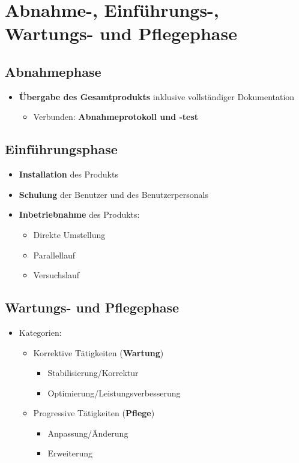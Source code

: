 \section{Abnahme-, Einführungs-, Wartungs- und Pflegephase}
	
\subsection{Abnahmephase}
\begin{itemize}
\item \textbf{Übergabe des Gesamtprodukts} inklusive vollständiger Dokumentation
\begin{itemize}
\item Verbunden: \textbf{Abnahmeprotokoll und -test}
\end{itemize}
\end{itemize}
	
\subsection{Einführungsphase}

\begin{itemize}
\item \textbf{Installation} des Produkts
\item \textbf{Schulung} der Benutzer und des Benutzerpersonals
\item \textbf{Inbetriebnahme} des Produkts:
\begin{itemize}
\item Direkte Umstellung
\item Parallellauf
\item Versuchslauf
\end{itemize}
\end{itemize}
		
\subsection{Wartungs- und Pflegephase}

\begin{itemize}
\item Kategorien:
\begin{itemize}
\item Korrektive Tätigkeiten (\textbf{Wartung})
\begin{itemize}
\item Stabilisierung/Korrektur
\item Optimierung/Leistungsverbesserung
\end{itemize}
\item Progressive Tätigkeiten (\textbf{Pflege})
\begin{itemize}
\item Anpassung/Änderung
\item Erweiterung
\end{itemize}
\end{itemize}
\end{itemize}
